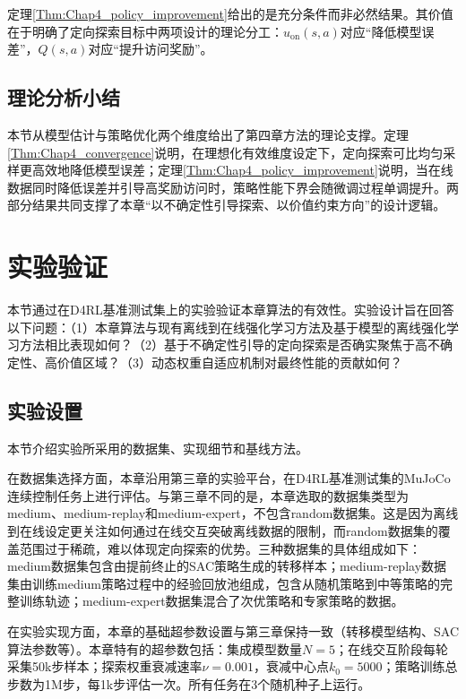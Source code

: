 定理\ref{Thm:Chap4_policy_improvement}给出的是充分条件而非必然结果。其价值在于明确了定向探索目标中两项设计的理论分工：$u_{\mathrm{on}}(s,a)$对应“降低模型误差”，$Q(s,a)$对应“提升访问奖励”。

\subsection{理论分析小结}\label{Sec4.3.3}

本节从模型估计与策略优化两个维度给出了第四章方法的理论支撑。定理\ref{Thm:Chap4_convergence}说明，在理想化有效维度设定下，定向探索可比均匀采样更高效地降低模型误差；定理\ref{Thm:Chap4_policy_improvement}说明，当在线数据同时降低误差并引导高奖励访问时，策略性能下界会随微调过程单调提升。两部分结果共同支撑了本章“以不确定性引导探索、以价值约束方向”的设计逻辑。

\section{实验验证}\label{Sec4.4}

本节通过在D4RL基准测试集上的实验验证本章算法的有效性。实验设计旨在回答以下问题：（1）本章算法与现有离线到在线强化学习方法及基于模型的离线强化学习方法相比表现如何？（2）基于不确定性引导的定向探索是否确实聚焦于高不确定性、高价值区域？（3）动态权重自适应机制对最终性能的贡献如何？


\subsection{实验设置}\label{Sec4.4.1}

本节介绍实验所采用的数据集、实现细节和基线方法。

在数据集选择方面，本章沿用第三章的实验平台，在D4RL基准测试集\cite{Fu2020D4RL}的MuJoCo连续控制任务上进行评估。与第三章不同的是，本章选取的数据集类型为medium、medium-replay和medium-expert，不包含random数据集。这是因为离线到在线设定更关注如何通过在线交互突破离线数据的限制，而random数据集的覆盖范围过于稀疏，难以体现定向探索的优势。三种数据集的具体组成如下：medium数据集包含由提前终止的SAC策略生成的转移样本；medium-replay数据集由训练medium策略过程中的经验回放池组成，包含从随机策略到中等策略的完整训练轨迹；medium-expert数据集混合了次优策略和专家策略的数据。

在实验实现方面，本章的基础超参数设置与第三章保持一致（转移模型结构、SAC算法参数等）。本章特有的超参数包括：集成模型数量$N=5$；在线交互阶段每轮采集50k步样本；探索权重衰减速率$\nu=0.001$，衰减中心点$k_0=5000$；策略训练总步数为1M步，每1k步评估一次。所有任务在3个随机种子上运行。

